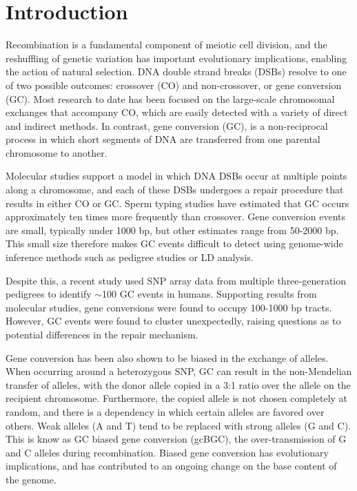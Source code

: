 
\section{Introduction}

Recombination is a fundamental component of meiotic cell division, and the reshuffling of genetic variation has important evolutionary implications, enabling the action of natural selection.
DNA double strand breaks (DSBs) resolve to one of two possible outcomes: crossover (CO) and non-crossover, or gene conversion (GC).
Most research to date has been focused on the large-scale chromosomal exchanges that accompany CO, which are easily detected with a variety of direct and indirect methods.
In contrast, gene conversion (GC), is a non-reciprocal process in which short segments of DNA are transferred from one parental chromosome to another.

Molecular studies support a model in which DNA DSBs occur at multiple points along a chromosome, and each of these DSBs undergoes a repair procedure that results in either CO or GC\cite{}. %
Sperm typing studies have estimated that GC occurs approximately ten times more frequently than crossover\cite{Jeffreys2004,Baudat2007,Cole2012}.
Gene conversion events are small, typically under 1000 bp\cite{}, but other estimates range from 50-2000 bp\cite{}.
This small size therefore makes GC events difficult to detect using genome-wide inference methods such as pedigree studies or LD analysis.

Despite this, a recent study used SNP array data from multiple three-generation pedigrees to identify $\sim$100 GC events in humans\cite{Williams2015}. 
Supporting results from molecular studies, gene conversions were found to occupy 100-1000 bp tracts.
However, GC events were found to cluster unexpectedly, raising questions as to potential differences in the repair mechanism.


Gene conversion has been also shown to be biased in the exchange of alleles\cite{}.
When occurring around a heterozygous SNP, GC can result in the non-Mendelian transfer of alleles, with the donor allele copied in a 3:1 ratio over the allele on the recipient chromosome.
Furthermore, the copied allele is not chosen completely at random, and there is a dependency in which certain alleles are favored over others.
Weak alleles (A and T) tend to be replaced with strong alleles (G and C). %
This is know as GC biased gene conversion (gcBGC), the over-transmission of G and C alleles during recombination.
Biased gene conversion has evolutionary implications, and has contributed to an ongoing change on the base content of the genome\cite{Bherer2014}.


